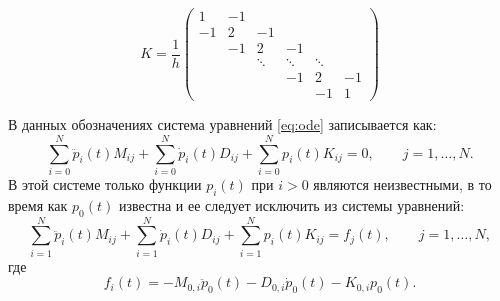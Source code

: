 \documentclass[12pt]{article}
\begin{document}
\[
K = \frac{1}{h}
\begin{pmatrix}
1 & -1 & \\
-1 & 2 & -1\\
& -1 & 2 & -1\\
& & \ddots & \ddots & \ddots \\
& & & -1 & 2 & -1\\
& & & & -1 & 1
\end{pmatrix}
\]

В данных обозначениях система уравнений \eqref{eq:ode} записывается как:
\[
\sum_{i=0}^N \ddot p_i(t) M_{ij} 
+ \sum_{i=0}^N \dot p_i(t) D_{ij} 
+ \sum_{i=0}^N p_i(t) K_{ij} = 0, \qquad j = 1, \dots,
N.
\]
В этой системе только функции $p_i(t)$ при $i > 0$ являются  неизвестными, в то
время как $p_0(t)$ известна и ее следует исключить из системы уравнений:
\[
\sum_{i=1}^N \ddot p_i(t) M_{ij} 
+ \sum_{i=1}^N \dot p_i(t) D_{ij} 
+ \sum_{i=1}^N p_i(t) K_{ij} = f_j(t), \qquad j = 1, \dots,
N,
\]
где 
\[f_i(t) = -M_{0,i} \ddot p_0(t) -D_{0,i} \dot p_0(t) -K_{0,i} p_0(t).\]
\end{document}
